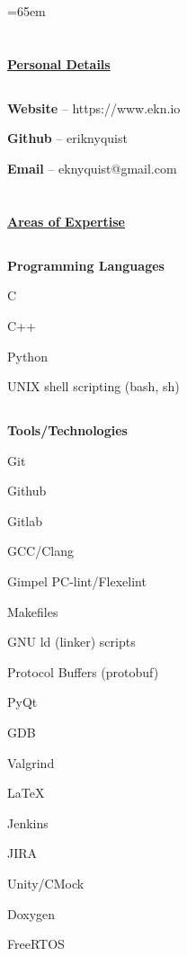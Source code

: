 \documentclass[6pt]{article}
\begin{document}
%
%
\begin{minipage}{13em}
\textheight=65em
\section*{}
\bigskip{}
\bigskip{}
{\underline{\textbf{Personal Details}}}
\subsection*{}
{\small {\bfseries Website} -- https://www.ekn.io

{\bfseries Github} -- eriknyquist

{\bfseries Email} -- eknyquist@gmail.com}

\section*{}
{\underline{\textbf{Areas of Expertise}}}
\subsection*{}
{\textbf{Programming Languages}}

{\small C

C++

Python

UNIX shell scripting (bash, sh)}

\subsection*{}
{\textbf{Tools/Technologies}}

{\small Git

Github

Gitlab

GCC/Clang

Gimpel PC-lint/Flexelint

Makefiles

GNU ld (linker) scripts

Protocol Buffers (protobuf)

PyQt

GDB

Valgrind

{\LaTeX}

Jenkins

JIRA

Unity/CMock

Doxygen

FreeRTOS

}
\end{minipage}
\end{document}

